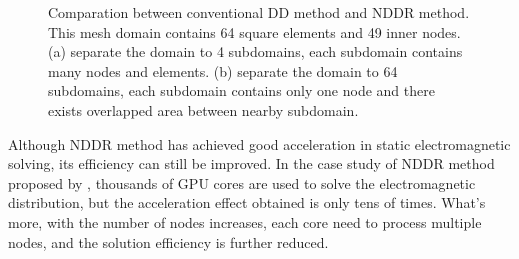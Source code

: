 \documentclass[journal,transmag]{IEEEtran}
\begin{document}
\begin{figure}
	\centering
	\caption{Comparation between conventional DD method and NDDR method. This mesh domain contains 64 square elements and 49 inner nodes. (a) separate the domain to 4 subdomains, each subdomain contains many nodes and elements. (b) separate the domain to 64 subdomains, each subdomain contains only one node and there exists overlapped area between nearby subdomain.}
\end{figure}
Although NDDR method has achieved good acceleration in static electromagnetic solving, its efficiency can still be improved. In the case study of NDDR method proposed by \cite{IEEEhowto:Liu}, thousands of GPU cores are used to solve the electromagnetic distribution, but the acceleration effect obtained is only tens of times. What's more, with the number of nodes increases, each core need to process multiple nodes, and the solution efficiency is further reduced.
\end{document}
